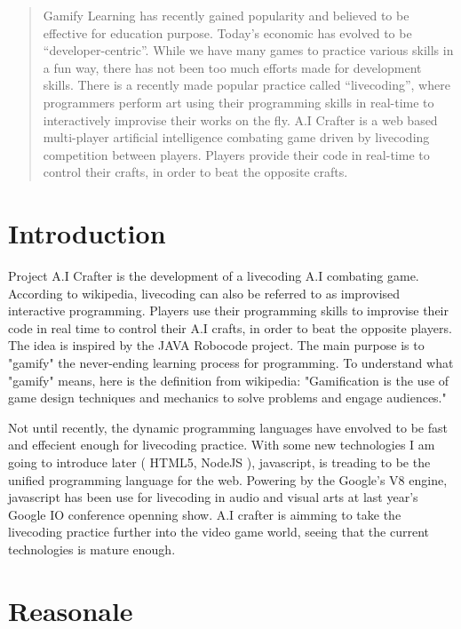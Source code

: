 \documentclass[12pt]{article}
\begin{document}
\maketitle

\begin{abstract}
Gamify Learning has recently gained popularity and believed to be effective for education purpose. Today’s economic has evolved to be “developer-centric”\cite{venkatesh2011}. While we have many games to practice various skills in a fun way, there has not been too much efforts made for development skills. 
There is a recently made popular practice called “livecoding”, where programmers perform art using their programming skills in real-time to interactively improvise their works on the fly. 
A.I Crafter is a web based multi-player artificial intelligence combating game driven by livecoding competition between players. Players provide their code in real-time to control their crafts, in order to beat the opposite crafts. 
\end{abstract}

\section{Introduction}
Project A.I Crafter is the development of a livecoding A.I combating game. According to wikipedia, livecoding can also be referred to as improvised interactive programming. Players use their programming skills to improvise their code in real time to control their A.I crafts, in order to beat the opposite players. The idea is inspired by the JAVA Robocode\cite{robocode01} project. The main purpose is to "gamify" the never-ending learning process for programming. To understand what "gamify" means, here is the definition from wikipedia: "Gamification is the use of game design techniques and mechanics to solve problems and engage audiences."

Not until recently, the dynamic programming languages have envolved to be fast and effecient enough for livecoding practice. With some new technologies I am going to introduce later ( HTML5, NodeJS ), javascript, is treading to be the unified programming language for the web. Powering by the Google's V8 engine, javascript has been use for livecoding in audio and visual arts at last year's Google IO conference openning show. A.I crafter is aimming to take the livecoding practice further into the video game world, seeing that the current technologies is mature enough.

\section{Reasonale}
\end{document}
